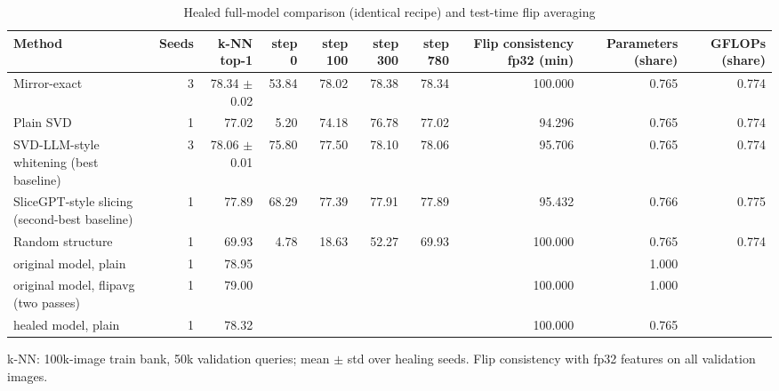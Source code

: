 \begin{table}[t]
\centering
\small
\caption{Healed full-model comparison (identical recipe) and test-time flip averaging}
\label{tab:table1_healed}
\begin{tabular}{lrrrrrrrrr}
\toprule
Method & Seeds & k-NN top-1 & step 0 & step 100 & step 300 & step 780 & Flip consistency fp32 (min) & Parameters (share) & GFLOPs (share) \\
\midrule
Mirror-exact & 3 & 78.34 $\pm$ 0.02 & 53.84 & 78.02 & 78.38 & 78.34 & 100.000 & 0.765 & 0.774 \\
Plain SVD & 1 & 77.02 & 5.20 & 74.18 & 76.78 & 77.02 & 94.296 & 0.765 & 0.774 \\
SVD-LLM-style whitening (best baseline) & 3 & 78.06 $\pm$ 0.01 & 75.80 & 77.50 & 78.10 & 78.06 & 95.706 & 0.765 & 0.774 \\
SliceGPT-style slicing (second-best baseline) & 1 & 77.89 & 68.29 & 77.39 & 77.91 & 77.89 & 95.432 & 0.766 & 0.775 \\
Random structure & 1 & 69.93 & 4.78 & 18.63 & 52.27 & 69.93 & 100.000 & 0.765 & 0.774 \\
original model, plain & 1 & 78.95 &  &  &  &  &  & 1.000 &  \\
original model, flipavg (two passes) & 1 & 79.00 &  &  &  &  & 100.000 & 1.000 &  \\
healed model, plain & 1 & 78.32 &  &  &  &  & 100.000 & 0.765 &  \\
\bottomrule
\end{tabular}
\par\smallskip\footnotesize k-NN: 100k-image train bank, 50k validation queries; mean $\pm$ std over healing seeds. Flip consistency with fp32 features on all validation images.
\end{table}
